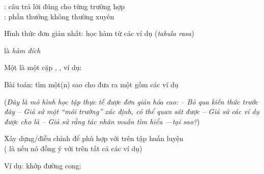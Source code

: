 \documentclass{article}
\begin{document}
\begin{huge}
\vspace*{0.1in}

\textwidth
{}

: câu trả lời đúng cho từng trường hợp\\
: phần thưởng không thường xuyên




Hình thức đơn giản nhất: học hàm từ các ví dụ (\emph{tabula rasa})

\al là \emph{hàm đích}

Một  là một cặp , , ví dụ: 

Bài toán: tìm một(n)  \nl
   sao cho \nl
   đưa ra một  gồm các ví dụ

(\emph{Đây là mô hình học tập thực tế được đơn giản hóa cao:\al
  -- Bỏ qua kiến thức trước đây\al
  -- Giả sử một ``môi trường'' xác định, có thể quan sát được \al
  -- Giả sử các ví dụ được cho là \emph{}\al
  -- Giả sử rằng tác nhân \emph{muốn} tìm hiểu ---tại sao?})





Xây dựng/điều chỉnh  để phù hợp với  trên tập huấn luyện \\
( là  nếu nó đồng ý với  trên tất cả các ví dụ)

Ví dụ: khớp đường cong:


\end{huge}
\end{document}
